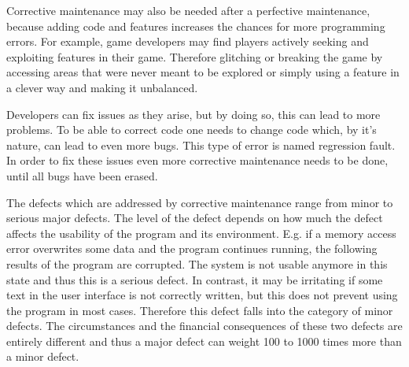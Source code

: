 Corrective maintenance may also be needed after a perfective maintenance, because adding code and features increases the chances for more programming errors. \citep{jarman_testing_2010} \newline
For example, game developers may find players actively seeking and exploiting features in their game. Therefore glitching or breaking the game by accessing areas that were never meant to be explored or simply using a feature in a clever way and making it unbalanced.\citep{moore_game_2009}

Developers can fix issues as they arise, but by doing so, this can lead to more problems. To be able to correct code one needs to change code which, by it's nature, can lead to even more bugs. This type of error is named regression fault. In order to fix these issues even more corrective maintenance needs to be done, until all bugs have been erased. \citep{moore_game_2009}

The defects which are addressed by corrective maintenance range from minor to serious major defects. The level of the defect depends on how much the defect affects the usability of the program and its environment. E.g. if a memory access error overwrites some data and the program continues running, the following results of the program are corrupted. The system is not usable anymore in this state and thus this is a serious defect. In contrast, it may be irritating if some text in the user interface is not correctly written, but this does not prevent using the program in most cases. Therefore this defect falls into the category of minor defects. The circumstances and the financial consequences of these two defects are entirely different and thus a major defect can weight 100 to 1000 times more than a minor defect.\citep{sneed_software_2005}

